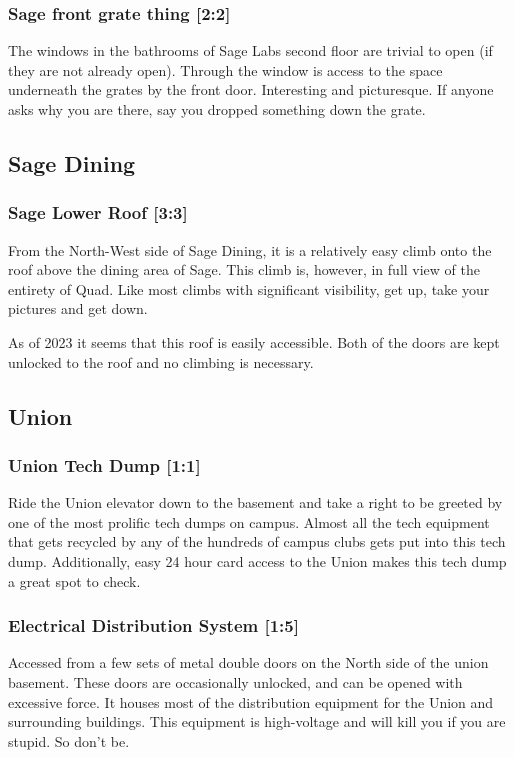 \documentclass{article}
\begin{document}
\subsubsection{Sage front grate thing [2:2]}
The windows in the bathrooms of Sage Labs second floor are trivial to open (if they are not already open). Through the window is access to the space underneath the grates by the front door. Interesting and picturesque. If anyone asks why you are there, say you dropped something down the grate.
\pagebreak
\subsection{Sage Dining}
\subsubsection{Sage Lower Roof [3:3]}
From the North-West side of Sage Dining, it is a relatively easy climb onto the roof above the dining area of Sage. This climb is, however, in full view of the entirety of Quad. Like most climbs with significant visibility, get up, take your pictures and get down.

As of 2023 it seems that this roof is easily accessible. Both of the doors are kept unlocked to the roof and no climbing is necessary.
\pagebreak
\subsection{Union}
\subsubsection{Union Tech Dump [1:1]}
Ride the Union elevator down to the basement and take a right to be greeted by one of the most prolific tech dumps on campus. Almost all the tech equipment that gets recycled by any of the hundreds of campus clubs gets put into this tech dump. Additionally, easy 24 hour card access to the Union makes this tech dump a great spot to check.

 \subsubsection{Electrical Distribution System [1:5]}
Accessed from a few sets of metal double doors on the North side of the union basement. These doors are occasionally unlocked, and can be opened with excessive force. It houses most of the distribution equipment for the Union and surrounding buildings. This equipment is high-voltage and will kill you if you are stupid. So don’t be.
\pagebreak
\end{document}
